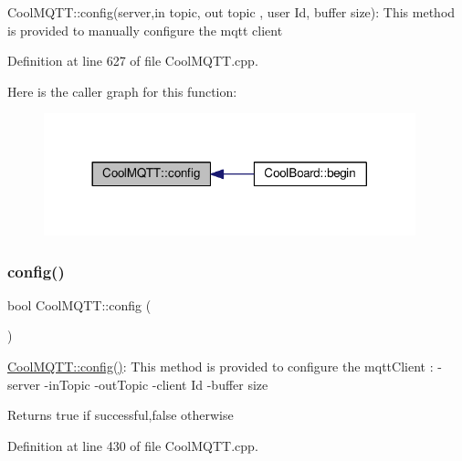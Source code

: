 Cool\+M\+Q\+T\+T\+::config(server,in topic, out topic , user Id, buffer size)\+: This method is provided to manually configure the mqtt client 

Definition at line 627 of file Cool\+M\+Q\+T\+T.\+cpp.

Here is the caller graph for this function\+:\nopagebreak
\begin{figure}[H]
\begin{center}
\leavevmode
\includegraphics[width=305pt]{class_cool_m_q_t_t_a9b703de4f1358f0ee7a5e8c44979c648_icgraph}
\end{center}
\end{figure}
\mbox{\label{class_cool_m_q_t_t_a6571671781a505feca9a8a56e256c6bc}} 
\subsubsection{\texorpdfstring{config()}{config()}\hspace{0.1cm}{\footnotesize\ttfamily [2/2]}}
{\footnotesize\ttfamily bool Cool\+M\+Q\+T\+T\+::config (\begin{DoxyParamCaption}{ }\end{DoxyParamCaption})}

\hyperlink{class_cool_m_q_t_t_a6571671781a505feca9a8a56e256c6bc}{Cool\+M\+Q\+T\+T\+::config()}\+: This method is provided to configure the mqtt\+Client \+: -\/server -\/in\+Topic -\/out\+Topic -\/client Id -\/buffer size

\begin{DoxyReturn}{Returns}
true if successful,false otherwise 
\end{DoxyReturn}


Definition at line 430 of file Cool\+M\+Q\+T\+T.\+cpp.

\mbox{\label{class_cool_m_q_t_t_a50075d0ab23a327ab897fd6adad20eda}} 
